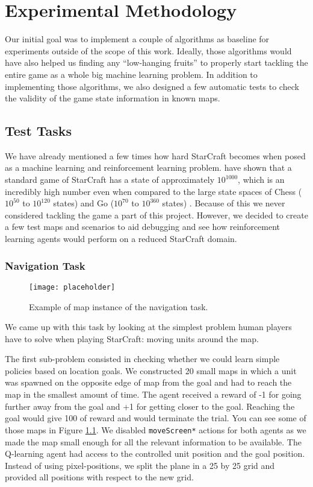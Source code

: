\chapter{Experimental Methodology} 

Our initial goal was to implement a couple of algorithms as baseline for
experiments outside of the scope of this work. Ideally, those algorithms would
have also helped us finding any ``low-hanging fruits'' to properly start
tackling the entire game as a whole big machine learning problem. In addition to
implementing those algorithms, we also designed a few automatic tests to check
the validity of the game state information in known maps.

\section{Test Tasks}

We have already mentioned a few times how hard StarCraft becomes when posed as a
machine learning and reinforcement learning problem. \cite{ontanon2013survey}
have shown that a standard game of StarCraft has a state of approximately
$10^{1000}$, which is an incredibly high number even when compared to the large
state spaces of Chess ($10^{50}$ to $10^{120}$ states) and Go ($10^{70}$ to
$10^{360}$ states) \citep{papadimitriou2003computational}. Because of this we
never considered tackling the game a part of this project. However, we decided
to create a few test maps and scenarios to aid debugging and see how
reinforcement learning agents would perform on a reduced StarCraft domain.

\subsection{Navigation Task}

\begin{figure}[h]
    \centering
    \texttt{[image: placeholder]}
    \caption{Example of map instance of the navigation task.}
    \label{fig:nav_task}
\end{figure}

We came up with this task by looking at the simplest problem human players have
to solve when playing StarCraft: moving units around the map.

The first sub-problem consisted in checking whether we could learn simple
policies based on location goals. We constructed 20 small maps in which a unit
was spawned on the opposite edge of map from the goal and had to reach the map
in the smallest amount of time. The agent received a reward of -1 for going
further away from the goal and +1 for getting closer to the goal. Reaching the
goal would give 100 of reward and would terminate the trial. You can see some of
those maps in Figure \ref{fig:nav_task}. We disabled \texttt{moveScreen*}
actions for both agents as we made the map small enough for all the relevant
information to be available. The Q-learning agent had access to the controlled
unit position and the goal position. Instead of using pixel-positions, we split
the plane in a 25 by 25 grid and provided all positions with respect to the
new grid. 

